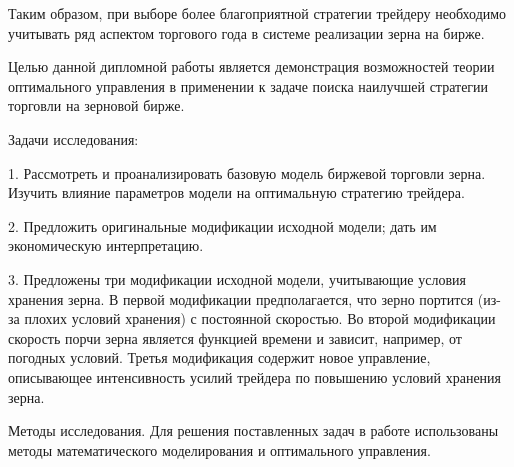 Таким образом, при выборе более благоприятной стратегии трейдеру необходимо учитывать ряд аспектом торгового года в системе реализации зерна на бирже.

Целью данной дипломной работы является демонстрация возможностей теории оптимального управления в применении к задаче поиска наилучшей стратегии торговли на зерновой бирже.

Задачи исследования:


1.	Рассмотреть и проанализировать базовую модель биржевой торговли зерна. Изучить влияние параметров модели на оптимальную стратегию трейдера. 


2.	Предложить оригинальные модификации исходной модели; дать им экономическую интерпретацию.

3.  Предложены три модификации исходной модели, учитывающие условия хранения зерна. В первой модификации предполагается, что зерно портится (из-за плохих условий хранения) с постоянной скоростью. Во второй модификации скорость порчи зерна является функцией времени и зависит, например, от погодных условий. Третья модификация содержит новое управление, описывающее интенсивность усилий трейдера по повышению условий хранения зерна.

Методы исследования. Для решения поставленных задач в работе использованы методы математического моделирования и оптимального управления.

